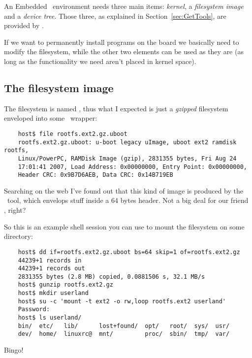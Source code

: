 An Embedded \Linux\ environment needs three main items: \emph{kernel}, a
\emph{filesystem image} and a \emph{device tree}. Those three, as
explained in Section~\ref{sec:GetTools}, are provided by
.

If we want to permanently install programs on the board we basically need
to modify the filesystem, while the other two elements can be used as they
are (as long as the functionality we need aren't placed in kernel space).

\subsection{The filesystem image}

    The filesystem is named , thus what I
    expected is just a \emph{gzipped}  filesystem enveloped
    into some \uBoot\ wrapper:

\begin{lstlisting}
    host$ file rootfs.ext2.gz.uboot
    rootfs.ext2.gz.uboot: u-boot legacy uImage, uboot ext2 ramdisk rootfs,
    Linux/PowerPC, RAMDisk Image (gzip), 2831355 bytes, Fri Aug 24
    17:01:41 2007, Load Address: 0x00000000, Entry Point: 0x00000000,
    Header CRC: 0x9B7D6AEB, Data CRC: 0x14B719EB
\end{lstlisting}

    Searching on the web I've found out that this kind of image is
    produced by the \mkimage\ tool, which envelops stuff inside a 64 bytes
    header. Not a big deal for our friend , right?

    So this is an example shell session you can use to mount the
    filesystem on some directory:
\begin{lstlisting}
    host$ dd if=rootfs.ext2.gz.uboot bs=64 skip=1 of=rootfs.ext2.gz
    44239+1 records in
    44239+1 records out
    2831355 bytes (2.8 MB) copied, 0.0881506 s, 32.1 MB/s
    host$ gunzip rootfs.ext2.gz
    host$ mkdir userland
    host$ su -c 'mount -t ext2 -o rw,loop rootfs.ext2 userland'
    Password:
    host$ ls userland/
    bin/  etc/   lib/      lost+found/  opt/   root/  sys/  usr/
    dev/  home/  linuxrc@  mnt/         proc/  sbin/  tmp/  var/
\end{lstlisting}
    Bingo!


